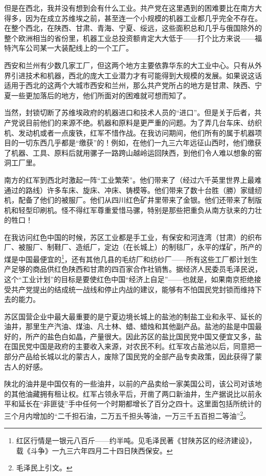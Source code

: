 \documentclass[10pt]{book}
\begin{document}
但是在西北，我并没有想到会有什么工业。共产党在这里遇到的困难要比在南方大得多，因为在成立苏维埃之前，甚至连一个小规模的机器工业都几乎完全不存在。在整个西北，在陕西、甘肃、青海、宁夏、绥远，这些面积总和几乎与俄国除外的整个欧洲相当的省份里，机器工业总投资额肯定大大低于——打个比方来说——福特汽车公司某一大装配线上的一个工厂。

西安和兰州有少数几家工厂，但这两个地方主要依靠华东的大工业中心。只有从外界引进技术和机器，西北的庞大工业潜力才有可能得到大规模的发展。如果说这话适用于西北的这两个大城市西安和兰州，那么共产党所占的地方是甘肃、陕西、宁夏一些更加落后的地方，他们所面对的困难就可想而知了。

当然，封锁切断了苏维埃政府的机器进口和技术人员的“进口”。但是关于后者，共产党说目前他们的来源不绝。机器和原料是更严重的问题。为了弄几台车床、纺织机、发动机或者一点废铁，红军不惜作战。在我访问期间，他们所有的属于机器项目的一切东西几乎都是“缴获”的！例如，在他们一九三六年远征山西时，他们缴获了机器、工具、原料后就用骡子一路跨山越岭运回陕西，到他们令人难以想象的窑洞工厂里。

南方的红军到西北时激起一阵“工业繁荣”。他们带来了（经过六千英里世界上最难通过的路线）许多车床、旋床、冲床、铸模等。他们带来了数十台胜（勝）家缝纫机，配备了他们的被服厂。他们从四川红色矿井里带来了金银。他们还带来了制版机和轻型印刷机。怪不得红军尊重爱惜马骡，特别是那些把重负从南方驮来的力壮的牲口！

在我访问红色中国的时候，苏区工业都是手工业，有保安和河连湾（甘肃）的织布厂、被服厂、制鞋厂、造纸厂，定边（在长城上）的制毯厂，永平的煤矿，所产的煤是中国最便宜的\footnote{红区行情是一银元八百斤——约半吨。见毛泽民著《甘陕苏区的经济建设》，载《斗争》一九三六年四月二十四日陕西保安。}，还有其他几县的毛纺厂和纺纱厂——所有这些工厂都计划生产足够的商品供红色陕西和甘肃的四百家合作社销售。据经济人民委员毛泽民说，这个“工业计划”的目标是要使红色中国“经济上自足”——也就是，如果南京拒绝接受共产党提出的结成统一战线和停止内战的建议，能够有不怕国民党封锁而维持下去的能力。

苏区国营企业中最大最重要的是宁夏边境长城上的盐池的制盐工业和永平、延长的油井，那里生产汽油、煤油、凡士林、蜡、蜡烛和其他副产品。盐池的盐是中国最好的，所产的盐色白如晶，产量很大。因此苏区的盐比国民党中国又便宜又多，盐在国民党中国是政府的主要收入来源，对农民不利。红军攻占盐池以后，同意把一部分产品给长城以北的蒙古人，废除了国民党的全部产品专卖政策，因此获得了蒙古人的好感。

陕北的油井是中国仅有的一些油井，以前的产品卖给一家美国公司，该公司对该地的其他油藏拥有租让权。红军占领永平后，开凿了两口新油井，生产据说比以前永平和延长在“非匪徒”手中任何一个时期都增长了百分之四十。这里面包括所统计的三个月内增加的“二千担石油，二万五千担头等油，一万三千五百担二等油”\footnote{毛泽民上引文。}。
\end{document}
